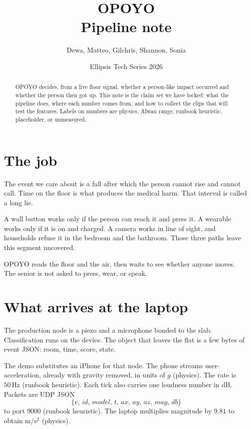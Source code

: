 \documentclass[11pt,a4paper]{article}
\title{\textbf{OPOYO}\\[0.35em]\large Pipeline note}
\author{Dewa, Matteo, Gilchris, Shannon, Sonia}
\date{Ellipsis Tech Series 2026}
\newcommand{\src}[1]{\textnormal{\small (#1)}}
\begin{document}
\maketitle
\thispagestyle{fancy}

\begin{abstract}
\noindent
OPOYO decides, from a live floor signal, whether a person-like impact occurred and whether the person then got up. This note is the claim set we have locked: what the pipeline does, where each number comes from, and how to collect the clips that will test the features. Labels on numbers are physics, Alwan range, runbook heuristic, placeholder, or unmeasured.
\end{abstract}

\section{The job}

The event we care about is a fall after which the person cannot rise and cannot call. Time on the floor is what produces the medical harm. That interval is called a long lie.

A wall button works only if the person can reach it and press it. A wearable works only if it is on and charged. A camera works in line of sight, and households refuse it in the bedroom and the bathroom. Those three paths leave this segment uncovered.

OPOYO reads the floor and the air, then waits to see whether anyone moves. The senior is not asked to press, wear, or speak.

\section{What arrives at the laptop}

The production node is a piezo and a microphone bonded to the slab. Classification runs on the device. The object that leaves the flat is a few bytes of event JSON: room, time, score, state.

The demo substitutes an iPhone for that node. The phone streams user-acceleration, already with gravity removed, in units of \(g\) \src{physics}. The rate is \(50\,\mathrm{Hz}\) \src{runbook heuristic}. Each tick also carries one loudness number in dB. Packets are UDP JSON
\[
\{v,\,id,\,model,\,t,\,ax,\,ay,\,az,\,mag,\,db\}
\]
to port \(9000\) \src{runbook heuristic}. The laptop multiplies magnitude by \(9.81\) to obtain \(\mathrm{m/s^2}\) \src{physics}.
\end{document}
